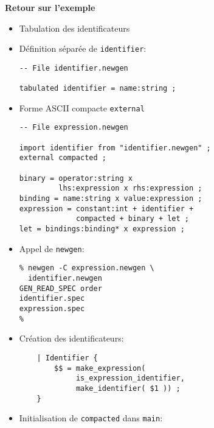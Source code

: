 \documentclass[11pt]{article}
\begin{document}
{\newpage

\begin{center}
{\huge\bf Retour sur l'exemple}
\end{center}

\vskip 2cm

\begin{itemize}
\item Tabulation des identificateurs
\item Définition séparée de {\tt identifier}:

\begin{verbatim}
-- File identifier.newgen

tabulated identifier = name:string ;
\end{verbatim}
\item Forme ASCII compacte {\tt external}

\begin{verbatim}
-- File expression.newgen

import identifier from "identifier.newgen" ;
external compacted ;

binary = operator:string x 
         lhs:expression x rhs:expression ;
binding = name:string x value:expression ;
expression = constant:int + identifier + 
             compacted + binary + let ;
let = bindings:binding* x expression ;
\end{verbatim}
\end{itemize}

\newpage

\vskip 2cm

\begin{itemize}
\item Appel de {\tt newgen}:

\begin{verbatim}
% newgen -C expression.newgen \
  identifier.newgen
GEN_READ_SPEC order
identifier.spec
expression.spec
%
\end{verbatim}
\item Création des identificateurs:

\begin{verbatim}
    | Identifier {
        $$ = make_expression( 
             is_expression_identifier, 
             make_identifier( $1 )) ;
    } 
\end{verbatim}
\end{itemize}

\newpage

\vskip 2cm

\begin{itemize}
\item Initialisation de {\tt compacted} dans {\tt main}:


\end{itemize}}
\end{document}
